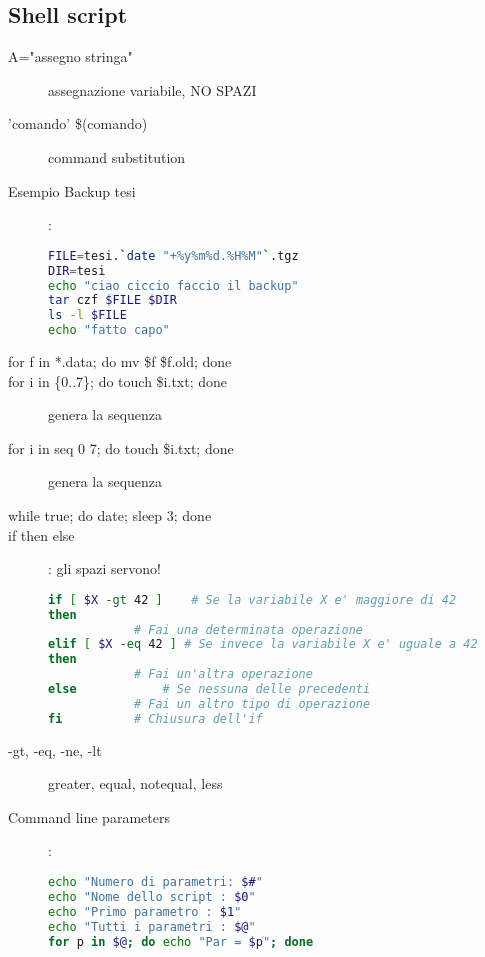 \documentclass[a4paper, 12pt]{article}
\begin{document}
\subsection{Shell script}
\begin{description}
\item[A="assegno stringa"] assegnazione variabile, NO SPAZI
\item['comando'   \$(comando)] command substitution
\item[Esempio Backup tesi]:
\begin{lstlisting}[language = sh]
FILE=tesi.`date "+%y%m%d.%H%M"`.tgz
DIR=tesi
echo "ciao ciccio faccio il backup"
tar czf $FILE $DIR
ls -l $FILE
echo "fatto capo"
\end{lstlisting}
\item[for f in *.data; do mv \$f \$f.old; done] 
\item[for i in \{0..7\}; do touch \$i.txt; done] genera la sequenza
\item[for i in \textquotesingle seq 0 7\textquotesingle; do touch \$i.txt; done] genera la sequenza
\item[while true; do date; sleep 3; done]
\item[if then else]: gli spazi servono!
\begin{lstlisting}[language = sh]
if [ $X -gt 42 ] 	# Se la variabile X e' maggiore di 42
then
			# Fai una determinata operazione
elif [ $X -eq 42 ] # Se invece la variabile X e' uguale a 42
then
			# Fai un'altra operazione
else 			# Se nessuna delle precedenti
			# Fai un altro tipo di operazione
fi 			# Chiusura dell'if
\end{lstlisting}
\item[-gt, -eq, -ne, -lt] greater, equal, notequal, less
\item[Command line parameters]:
\begin{lstlisting}[language = sh]
echo "Numero di parametri: $#"
echo "Nome dello script : $0"
echo "Primo parametro : $1"
echo "Tutti i parametri : $@"
for p in $@; do echo "Par = $p"; done
\end{lstlisting}

\end{description}
\end{document}
